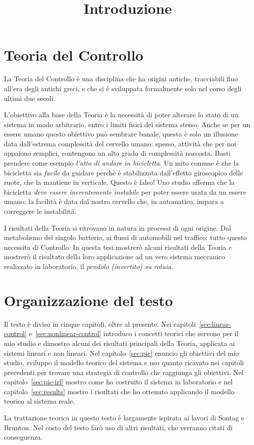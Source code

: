 
\title{Introduzione}
\maketitle
\label{sec:intro}


\section{Teoria del Controllo}
La Teoria del Controllo è una disciplina che ha origini antiche,
tracciabili fino all'era degli antichi greci,
e che si è sviluppata formalmente solo nel corso degli ultimi due secoli.

L'obiettivo alla base della Teoria è la necessità di poter alterare
lo stato di un sistema in modo arbitrario, entro i limiti fisici
del sistema stesso.
Anche se per un essere umano questo obiettivo può sembrare banale,
questa è solo un illusione data dall'estrema complessità del cervello umano:
spesso, attività che per noi appaiono semplici, contengono un
alto grado di complessità nascosta.
Basti prendere come esempio \emph{l'atto di andare in bicicletta}.
Un mito comune è che la bicicletta sia \emph{facile} da guidare perchè
è stabilizzata dall'effetto giroscopico delle ruote, che la mantiene in verticale.
Questo è falso!
Uno studio
\cite{bicycle}
afferma che la bicicletta \emph{deve essere inerentemente instabile} per poter
essere usata da un essere umano; la facilità è data dal nostro cervello che,
in automatico, impara a correggere le instabilità.

I risultati della Teoria si ritrovano in natura in processi di ogni origine.
Dal metabolismo del singolo batterio, ai flussi di automobili nel traffico:
tutto questo necessita di Controllo.
In questa tesi mostrerò alcuni risultati della Teoria e
mostrerò il risultato della loro applicazione ad un vero sistema
meccanico realizzato in laboratorio, il \emph{pendolo (invertito) su rotaia}.

\section{Organizzazione del testo}
Il testo è diviso in cinque capitoli, oltre al presente.
Nei capitoli~\ref{sec:linear-control} e~\ref{sec:nonlinear-control} introduco
i concetti teorici che servono per il mio studio e dimostro alcuni dei risultati
principali della Teoria, applicata ai sistemi lineari e non lineari.
Nel capitolo~\ref{sec:pic} enuncio gli obiettivi del mio studio, sviluppo il modello
teorico del sistema e uso quanto ricavato nei capitoli
precedenti per trovare una strategia di controllo che raggiunga gli obiettivi.
Nel capitolo~\ref{sec:pic-irl} mostro come ho costruito il sistema in laboratorio
e nel capitolo~\ref{sec:results} mostro i risultati che ho ottenuto applicando
il modello teorico al sistema reale.

La trattazione teorica in questo testo è largamente ispirata ai lavori di
Sontag e Brunton.
Nel costo del testo farò uso di altri risultati, che verranno citati di conseguenza.